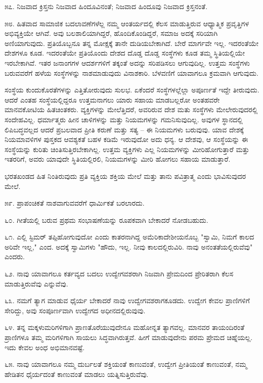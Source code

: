೫೭. ನಿಜವಾದ ಕ್ರಿಸ್ತನು ನಿಜವಾದ ಹಿಂದೂವಿನಂತೆ; ನಿಜವಾದ ಹಿಂದೂವು ನಿಜವಾದ ಕ್ರಿಸ್ತನಂತೆ.

೫೮. ಹಿತವಾದ ಸಾಮಾಜಿಕ ಬದಲಾವಣೆಗಳೆಲ್ಲ ನಮ್ಮ ಆಂತರ್ಯದಲ್ಲಿ ಕೆಲಸ ಮಾಡುತ್ತಿರುವ ಆಧ್ಯಾತ್ಮಿಕ ಪ್ರವೃತ್ತಿಗಳ ಅಭಿವ್ಯಕ್ತಿಯೇ ಆಗಿವೆ. ಅವು ಬಲಶಾಲಿಯಾಗಿದ್ದರೆ, ಹೊಂದಿಕೊಂಡಿದ್ದರೆ, ಸಮಾಜ ಅದಕ್ಕೆ ಸರಿಯಾಗಿ ಅಣಿಯಾಗುವುದು. ಪ್ರತಿಯೊಬ್ಬನೂ ತನ್ನ ಮೋಕ್ಷಕ್ಕೆ ತಾನೇ ದುಡಿಯಬೇಕಾಗಿದೆ. ಬೇರೆ ಮಾರ್ಗವೇ ಇಲ್ಲ. ಇದರಂತೆಯೇ ದೇಶಗಳೂ ಕೂಡ. ಇದರಂತೆಯೇ ಪ್ರತಿಯೊಂದು ದೇಶದ ದೊಡ್ಡ ದೊಡ್ಡ ಸಂಸ್ಥೆಗಳು ಕೂಡ ತಮ್ಮ ಸ್ಥಿತಿಯಲ್ಲಿಯೇ ಇರಬೇಕಾಗಿವೆ. ಇತರ ಜನಾಂಗಗಳ ಆದರ್ಶಗಳಿಗೆ ತಕ್ಕಂತೆ ಅದನ್ನು ಸರಿಪಡಿಸಲು ಆಗುವುದಿಲ್ಲ. ಉತ್ತಮ ಸಂಸ್ಥೆಗಳು ಬರುವವರೆಗೆ ಹಳೆಯ ಸಂಸ್ಥೆಗಳನ್ನು ನಾಶಮಾಡುವುದು ವಿನಾಶಕಾರಿ. ಬೆಳವಣಿಗೆ ಯಾವಾಗಲೂ ಕ್ರಮವಾಗಿ ಆಗುವುದು.

ಸಂಸ್ಥೆಯ ಕುಂದುಕೊರತೆಗಳನ್ನು ಎತ್ತಿತೋರುವುದು ಸುಲಭ. ಏಕೆಂದರೆ ಸಂಸ್ಥೆಗಳಲ್ಲೆಲ್ಲಾ ಅಪೂರ್ಣತೆ ಇದ್ದೇ ತೀರುವುದು. ಆದರೆ ಎಂತಹ ಸಂಸ್ಥೆಯಲ್ಲಿದ್ದರೂ ಉತ್ತಮನಾಗಲು ಯಾರು ಸಹಾಯ ಮಾಡಬಲ್ಲರೋ ಅಂತಹವರೇ ಮಾನವಕೋಟಿಯ ಹಿತಚಿಂತಕರು. ವ್ಯಕ್ತಿಗಳನ್ನು ಮೇಲೆತ್ತಿದರೆ, ಅವರಿರುವ ದೇಶ ಮತು ಸಂಸ್ಥೆಗಳು ಮೇಲೇರುವುದರಲ್ಲಿ ಸಂದೇಹವಿಲ್ಲ. ಧರ್ಮಾತ್ಮರು ಹೀನ ಚಾಳಿಗಳನ್ನು ಮತ್ತು ನಿಯಮಗಳನ್ನು ಗಮನಿಸುವುದಿಲ್ಲ. ಅವುಗಳ ಸ್ಥಾನದಲ್ಲಿ ಲಿಪಿಬದ್ಧವಲ್ಲದ ಆದರೆ ಪ್ರಬಲವಾದ ಪ್ರೀತಿ ಕರುಣೆ ಮತ್ತು ಸತ್ಯ – ಈ ನಿಯಮಗಳು ಬರುವುವು. ಯಾವ ದೇಶಕ್ಕೆ ನಿಯಮಾವಳಿಗಳ ಪುಸ್ತಕದ ಆವಶ್ಯಕತೆ ಬಹಳ ಕಡಿಮೆ ಇರುವುದೋ ಅದು ಧನ್ಯ. ಆ ದೇಶವು, ಆ ಸಂಸ್ಥೆಯನ್ನು ಈ ಸಂಸ್ಥೆಯನ್ನು ಕುರಿತು ಚಿಂತಿಸುತ್ತಿರಬೇಕಾಗಿಲ್ಲ. ಉತ್ತಮ ವ್ಯಕ್ತಿಗಳು ಎಲ್ಲ ನಿಯಮಗಳನ್ನು ಮೀರಿಹೋಗುತ್ತಾರೆ ಮತ್ತು ಇತರರಿಗೆ, ಅವರು ಯಾವುದೇ ಸ್ಥಿತಿಯಲ್ಲಿರಲಿ, ನಿಯಮಗಳನ್ನು ಮೀರಿ ಹೋಗಲು ಸಹಾಯ ಮಾಡುತ್ತಾರೆ.

ಭರತಖಂಡದ ಹಿತ ನಿಂತಿರುವುದು ಪ್ರತಿ ವ್ಯಕ್ತಿಯ ಶಕ್ತಿಯ ಮೇಲೆ ಮತ್ತು ತಾನು ಪವಿತ್ರಾತ್ಮ ಎಂದು ಭಾವಿಸುವುದರ ಮೇಲೆ.

೫೯. ಪ್ರಾಪಂಚಿಕತೆ ನಾಶವಾಗುವವರೆಗೆ ಧಾರ್ಮಿಕತೆ ಬರಲಾರದು.

೬೦. ಗೀತೆಯಲ್ಲಿ ಬರುವ ಪ್ರಥಮ ಸಂಭಾಷಣೆಯನ್ನು ರೂಪಕವಾಗಿ ಬೇಕಾದರೆ ನೋಡಬಹುದು.

೬೧. ಎಲ್ಲಿ ಸ್ಟಿಮರ್ ತಪ್ಪಿಹೋಗುವುದೋ ಎಂದು ಕಾತರನಾಗಿದ್ದ ಅಮೆರಿಕಾದೇಶೀಯನೊಬ್ಬ "ಸ್ವಾಮಿ, ನಿಮಗೆ ಕಾಲದ ಅರಿವೇ ಇಲ್ಲ," ಎಂದ. ಅದಕ್ಕೆ ಸ್ವಾಮಿಗಳು "ಹೌದು, ಇಲ್ಲ. ನೀವು ಕಾಲದಲ್ಲಿರುವಿರಿ. ನಾವು ಅನಂತತೆಯಲ್ಲಿರುವೆವು" ಎಂದರು.

೬೨. ನಾವು ಯಾವಾಗಲೂ ಕರ್ತವ್ಯದ ಬದಲು ಉದ್ವೇಗವಶರಾಗಿ ನಿಜವಾಗಿ ಪ್ರೇಮದಿಂದ ಪ್ರೇರಿತರಾಗಿ ಕೆಲಸ ಮಾಡುತ್ತಿರುವೆವು ಎನ್ನುವೆವು.

೬೩. ನಮಗೆ ತ್ಯಾಗ ಮಾಡುವ ಧೈರ್ಯ ಬೇಕಾದರೆ ನಾವು ಉದ್ವೇಗವಶರಾಗಕೂಡದು. ಉದ್ವೇಗ ಕೇವಲ ಪ್ರಾಣಿಗಳಿಗೆ ಸೇರಿದ್ದು, ಅವು ಸಂಪೂರ್ಣವಾಗಿ ಉದ್ವೇಗದ ಅಧೀನದಲ್ಲಿರುವುವು.

೬೪. ತನ್ನ ಮಕ್ಕಳುಮರಿಗಳಿಗಾಗಿ ಪ್ರಾಣತೊರೆಯುವುದೇನೂ ಮಹೋನ್ನತ ತ್ಯಾಗವಲ್ಲ. ಮಾನವರ ತಾಯಂದಿರಂತೆ ಪ್ರಾಣಿಗಳೂ ತಮ್ಮ ಮರಿಗಳಿಗಾಗಿ ಸಾಯಲು ಸಿದ್ಧವಾಗಿರುತ್ತವೆ. ಹೀಗೆ ಮಾಡುವುದೇನು ಪರಮ ಪ್ರೇಮದ ಚಿಹ್ನೆಯಲ್ಲ. ಇದು ಕೇವಲ ಅಂಧ ಅಭಿಮಾನವಷ್ಟೆ.

೬೫. ನಾವು ಯಾವಾಗಲೂ ನಮ್ಮ ದುರ್ಬಲತೆ ಶಕ್ತಿಯಂತೆ ಕಾಣುವಂತೆ, ಉದ್ವೇಗ ಪ್ರೀತಿಯಂತೆ ಕಾಣುವಂತೆ, ನಮ್ಮ ಹೇಡಿತನ ಧೈರ್ಯದಂತೆ ಕಾಣುವಂತೆ ಮಾಡಲು ಯತ್ನಿಸುತ್ತಿರುವೆವು.

